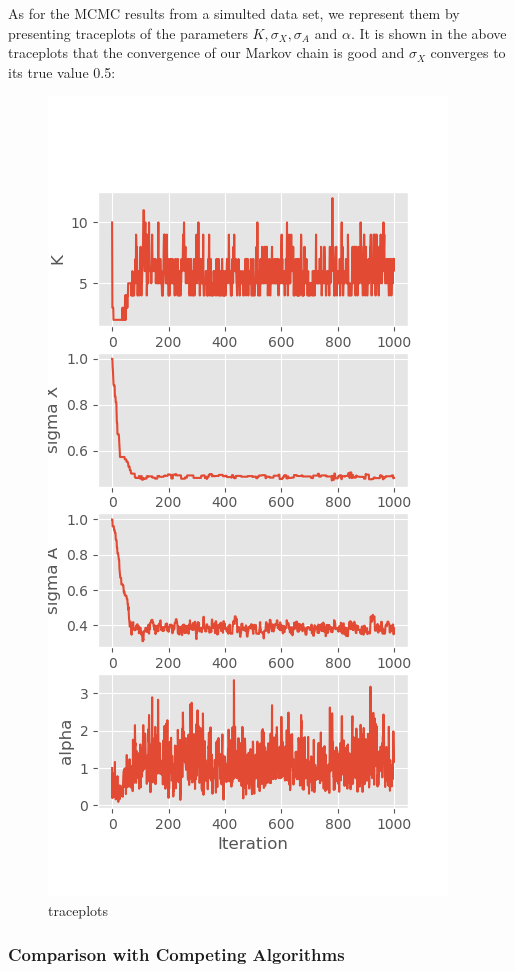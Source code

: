 \documentclass[11pt]{article}
\makeatletter
\def\maxwidth{\ifdim\Gin@nat@width>\linewidth\linewidth
    \else\Gin@nat@width\fi}
\let\Oldincludegraphics\includegraphics
\renewcommand{\includegraphics}[1]{\Oldincludegraphics[width=.8\maxwidth]{#1}}
\makeatother
\begin{document}
    As for the MCMC results from a simulted data set, we represent them by
presenting traceplots of the parameters \(K, \sigma_X, \sigma_A\) and
\(\alpha\). It is shown in the above traceplots that the convergence of
our Markov chain is good and \(\sigma_X\) converges to its true value
0.5:

    \begin{figure}
\centering
\includegraphics{traceplots_simulation.png}
\caption{traceplots}
\end{figure}

    \hypertarget{comparison-with-competing-algorithms}{%
\subsubsection{Comparison with Competing
Algorithms}\label{comparison-with-competing-algorithms}}
\end{document}
